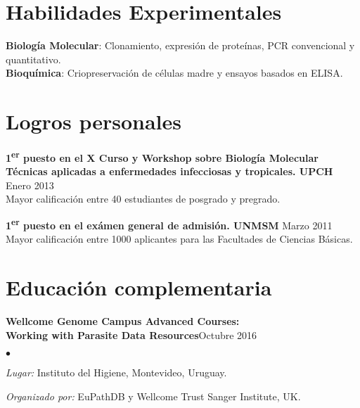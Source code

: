 \documentclass[margin,line]{res}
\newenvironment{list2}{
	\begin{list}{$\bullet$}{%
			\setlength{\itemsep}{0in}
			\setlength{\parsep}{0in} \setlength{\parskip}{0in}
			\setlength{\topsep}{0in} \setlength{\partopsep}{0in}
			\setlength{\leftmargin}{0.2in}}}{\end{list}}
\begin{document}
\begin{resume}
		\section{\sc Habilidades Experimentales}
		{\bf Biología Molecular}: Clonamiento, expresión de proteínas, PCR convencional y quantitativo.\\
		{\bf Bioquímica}: Criopreservación de células madre y ensayos basados en ELISA.\\
		
		\newpage
		
		\section{\sc Logros personales}
		
		{\bf 1\textsuperscript{er} puesto en el X Curso y Workshop sobre Biología Molecular \\Técnicas aplicadas a enfermedades infecciosas y tropicales. UPCH} \hfill Enero 2013\\
		Mayor calificación entre 40 estudiantes de posgrado y pregrado.
		
		{\bf 1\textsuperscript{er} puesto en el exámen general de admisión. UNMSM} \hfill Marzo 2011\\
		Mayor calificación entre 1000 aplicantes para las Facultades de Ciencias Básicas.\\
		
		\section{\sc Educación complementaria}
		
		{\bf Wellcome Genome Campus Advanced Courses:\\Working with Parasite Data Resources}\hfill {Octubre 2016}\\
		\vspace*{-.1in}%
		\begin{list2} %
			\item \textit{Lugar:} Instituto del Higiene, Montevideo, Uruguay.%
			\item \textit{Organizado por:} EuPathDB y Wellcome Trust Sanger Institute, UK. %
		\end{list2}
		

\end{resume}
\end{document}
